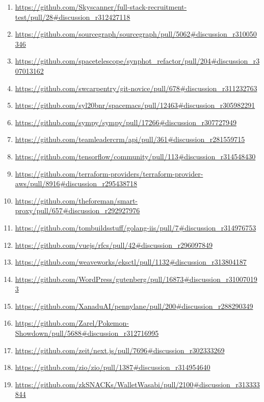 {\begin{enumerate}[topsep=0pt,itemsep=-1ex,partopsep=1ex,parsep=1ex]
    \item \url{https://github.com/Skyscanner/full-stack-recruitment-test/pull/28\#discussion_r312427118}
    \item \url{https://github.com/sourcegraph/sourcegraph/pull/5062\#discussion_r310050346}
    \item \url{https://github.com/spacetelescope/synphot_refactor/pull/204\#discussion_r307013162}
    \item \url{https://github.com/swcarpentry/git-novice/pull/678\#discussion_r311232763}
    \item \url{https://github.com/syl20bnr/spacemacs/pull/12463\#discussion_r305982291}
    \item \url{https://github.com/sympy/sympy/pull/17266\#discussion_r307727949}
    \item \url{https://github.com/teamleadercrm/api/pull/361\#discussion_r281559715}
    \item \url{https://github.com/tensorflow/community/pull/113\#discussion_r314548430}
    \item \url{https://github.com/terraform-providers/terraform-provider-aws/pull/8916\#discussion_r295438718}
    \item \url{https://github.com/theforeman/smart-proxy/pull/657\#discussion_r292927976}
    \item \url{https://github.com/tombuildsstuff/golang-iis/pull/7\#discussion_r314976753}
    \item \url{https://github.com/vuejs/rfcs/pull/42\#discussion_r296097849}
    \item \url{https://github.com/weaveworks/eksctl/pull/1132\#discussion_r313804187}
    \item \url{https://github.com/WordPress/gutenberg/pull/16873\#discussion_r310070193}
    \item \url{https://github.com/XanaduAI/pennylane/pull/200\#discussion_r288290349}
    \item \url{https://github.com/Zarel/Pokemon-Showdown/pull/5688\#discussion_r312716995}
    \item \url{https://github.com/zeit/next.js/pull/7696\#discussion_r302333269}
    \item \url{https://github.com/zio/zio/pull/1387\#discussion_r314954640}
    \item \url{https://github.com/zkSNACKs/WalletWasabi/pull/2100\#discussion_r313333844}
\end{enumerate}
}







